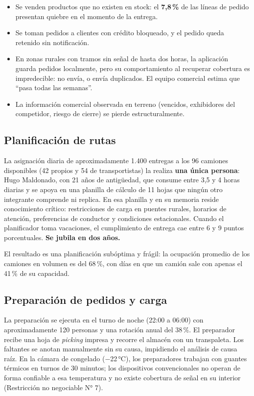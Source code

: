 \begin{itemize}
  \item Se venden productos que no existen en stock: el \textbf{7,8\,\%} de las líneas de
        pedido presentan quiebre en el momento de la entrega.
  \item Se toman pedidos a clientes con crédito bloqueado, y el pedido queda retenido sin
        notificación.
  \item En zonas rurales con tramos sin señal de hasta dos horas, la aplicación guarda
        pedidos localmente, pero su comportamiento al recuperar cobertura es
        impredecible: no envía, o envía duplicados. El equipo comercial estima que
        ``pasa todas las semanas''.
  \item La información comercial observada en terreno (vencidos, exhibidores del
        competidor, riesgo de cierre) se pierde estructuralmente.
\end{itemize}

\subsection{Planificación de rutas}

La asignación diaria de aproximadamente 1.400 entregas a los 96 camiones disponibles (42
propios y 54 de transportistas) la realiza \textbf{una única persona}: Hugo Maldonado,
con 21 años de antigüedad, que consume entre 3,5 y 4 horas diarias y se apoya en una
planilla de cálculo de 11 hojas que ningún otro integrante comprende ni replica. En esa
planilla y en su memoria reside conocimiento crítico: restricciones de carga en puentes
rurales, horarios de atención, preferencias de conductor y condiciones estacionales.
Cuando el planificador toma vacaciones, el cumplimiento de entrega cae entre 6 y 9
puntos porcentuales. \textbf{Se jubila en dos años.}

El resultado es una planificación subóptima y frágil: la ocupación promedio de los
camiones en volumen es del 68\,\%, con días en que un camión sale con apenas el 41\,\%
de su capacidad.

\subsection{Preparación de pedidos y carga}

La preparación se ejecuta en el turno de noche (22:00 a 06:00) con aproximadamente 120
personas y una rotación anual del 38\,\%. El preparador recibe una hoja de \emph{picking}
impresa y recorre el almacén con un transpaleta. Los faltantes se anotan manualmente sin
su causa, impidiendo el análisis de causa raíz. En la cámara de congelado
($-$22\,°C), los preparadores trabajan con guantes térmicos en turnos de 30 minutos; los
dispositivos convencionales no operan de forma confiable a esa temperatura y no existe
cobertura de señal en su interior (Restricción no negociable N° 7).

